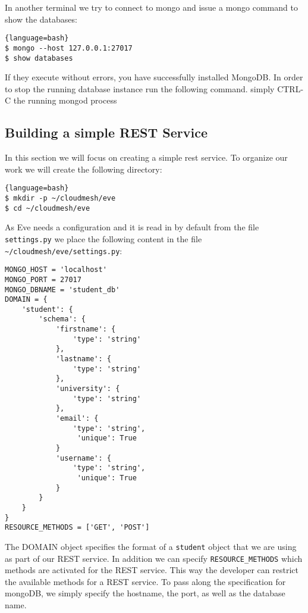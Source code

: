 In another terminal we try to connect to mongo and issue a mongo
command to show the databases:

\begin{lstlisting}{language=bash}
$ mongo --host 127.0.0.1:27017
$ show databases
\end{lstlisting}

If they execute without errors, you have successfully installed
MongoDB. In order to stop the running database instance run the
following command. simply CTRL-C the running mongod process

\subsection{Building a simple REST Service}

In this section we will focus on creating a simple rest service. To
organize our work we will create the following directory:


\begin{lstlisting}{language=bash}
$ mkdir -p ~/cloudmesh/eve
$ cd ~/cloudmesh/eve
\end{lstlisting}

As Eve needs a configuration and it is read in by default from the
file \verb|settings.py| we place the following content in the file
\verb|~/cloudmesh/eve/settings.py|:

\begin{lstlisting}
MONGO_HOST = 'localhost'
MONGO_PORT = 27017
MONGO_DBNAME = 'student_db'
DOMAIN = {
    'student': {
        'schema': {
            'firstname': {
                'type': 'string'
            },
            'lastname': {
                'type': 'string'
            },
            'university': {
                'type': 'string'
            },
            'email': {
                'type': 'string',
                 'unique': True
            }
            'username': {
                'type': 'string',
                 'unique': True
            }
        }
    }
}
RESOURCE_METHODS = ['GET', 'POST']
\end{lstlisting}

The DOMAIN object specifies the format of a \verb|student| object that
we are using as part of our REST service.  In addition we can specify
\verb|RESOURCE_METHODS| which methods are activated for the REST
service. This way the developer can restrict the available methods for
a REST service. To pass along the specification for mongoDB, we simply
specify the hostname, the port, as well as the database name.

